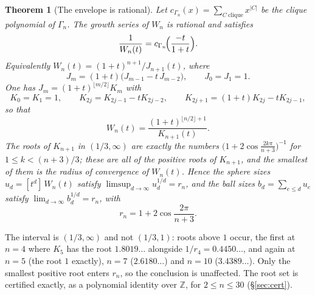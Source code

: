 \documentclass[11pt,a4paper]{article}
\newcommand{\Z}{\mathbb{Z}}
\newtheorem{theorem}{Theorem}
\theoremstyle{definition}
\theoremstyle{remark}
\theoremstyle{plain}
\begin{document}
\begin{theorem}[The envelope is rational]\label{thm:envelope}
Let $c_{\Gamma_n}(x)=\sum_{C\ \mathrm{clique}}x^{|C|}$ be the clique polynomial of $\Gamma_n$.
The growth series of $W_n$ is rational and satisfies
\[
\frac{1}{W_n(t)}=c_{\Gamma_n}\!\Bigl(\frac{-t}{1+t}\Bigr).
\]
Equivalently $W_n(t)=(1+t)^{n+1}/J_{n+1}(t)$, where
\[
J_m=(1+t)\bigl(J_{m-1}-t\,J_{m-2}\bigr),\qquad J_0=J_1=1 .
\]
One has $J_m=(1+t)^{\lfloor m/2\rfloor}K_m$ with
\begin{equation}\label{eq:Kdef}
K_0=K_1=1,\qquad K_{2j}=K_{2j-1}-tK_{2j-2},\qquad K_{2j+1}=(1+t)K_{2j}-tK_{2j-1},
\end{equation}
so that
\[
W_n(t)=\frac{(1+t)^{\lfloor n/2\rfloor+1}}{K_{n+1}(t)} .
\]
The roots of $K_{n+1}$ in $(1/3,\infty)$ are exactly the numbers
$\bigl(1+2\cos\frac{2k\pi}{n+3}\bigr)^{-1}$ for $1\le k<(n+3)/3$; these are all of the positive
roots of $K_{n+1}$, and the smallest of them is the radius of convergence of $W_n(t)$. Hence
the sphere sizes $u_d=[t^d]\,W_n(t)$ satisfy $\limsup_{d\to\infty}u_d^{1/d}=r_n$, and the ball
sizes $b_d=\sum_{e\le d}u_e$ satisfy $\lim_{d\to\infty}b_d^{1/d}=r_n$, with
\[
r_n=1+2\cos\frac{2\pi}{n+3}.
\]
\end{theorem}

The interval is $(1/3,\infty)$ and not $(1/3,1)$: roots above $1$ occur, the first at $n=4$
where $K_5$ has the root $1.8019\ldots$ alongside $1/r_4=0.4450\ldots$, and again at $n=5$
(the root $1$ exactly), $n=7$ ($2.6180\ldots$) and $n=10$ ($3.4389\ldots$). Only the smallest
positive root enters $r_n$, so the conclusion is unaffected. The root set is certified exactly,
as a polynomial identity over $\Z$, for $2\le n\le30$ (\S\ref{sec:cert}).
\end{document}
